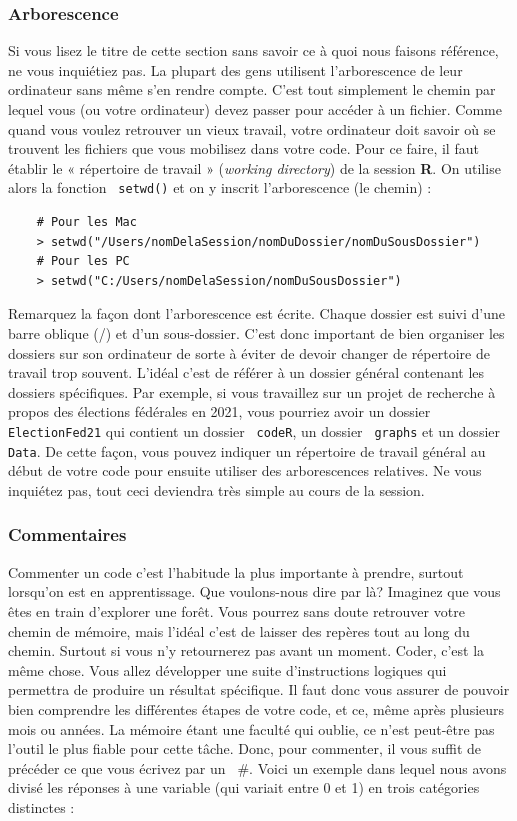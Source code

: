 \documentclass[10.5pt,a4paper]{article}
\newcommand{\rcode}[1]{\texttt{\color{rstudio} #1}}
\begin{document}
    \subsubsection{Arborescence}
    Si vous lisez le titre de cette section sans savoir ce à quoi nous faisons référence, ne vous inquiétiez pas. La plupart des gens utilisent l'arborescence de leur ordinateur sans même s'en rendre compte. C'est tout simplement le chemin par lequel vous (ou votre ordinateur) devez passer pour accéder à un fichier. Comme quand vous voulez retrouver un vieux travail, votre ordinateur doit savoir où se trouvent les fichiers que vous mobilisez dans votre code. Pour ce faire, il faut établir le « répertoire de travail » (\emph{working directory}) de la session \textbf{R}. On utilise alors la fonction \rcode{setwd()} et on y inscrit l'arborescence (le chemin) :
    
    \begin{lstlisting}
    # Pour les Mac
    > setwd("/Users/nomDelaSession/nomDuDossier/nomDuSousDossier")
    # Pour les PC
    > setwd("C:/Users/nomDelaSession/nomDuSousDossier")
    \end{lstlisting}
    
    Remarquez la façon dont l'arborescence est écrite. Chaque dossier est suivi d'une barre oblique (/) et d'un sous-dossier. C'est donc important de bien organiser les dossiers sur son ordinateur de sorte à éviter de devoir changer de répertoire de travail trop souvent. L'idéal c'est de référer à un dossier général contenant les dossiers spécifiques. Par exemple, si vous travaillez sur un projet de recherche à propos des élections fédérales en 2021, vous pourriez avoir un dossier \rcode{ElectionFed21} qui contient un dossier \rcode{codeR}, un dossier \rcode{graphs} et un dossier \rcode{Data}. De cette façon, vous pouvez indiquer un répertoire de travail général au début de votre code pour ensuite utiliser des arborescences relatives. Ne vous inquiétez pas, tout ceci deviendra très simple au cours de la session.
    
    \subsubsection{Commentaires}
    
    Commenter un code c'est l'habitude la plus importante à prendre, surtout lorsqu'on est en apprentissage. Que voulons-nous dire par là? Imaginez que vous êtes en train d'explorer une forêt. Vous pourrez sans doute retrouver votre chemin de mémoire, mais l'idéal c'est de laisser des repères tout au long du chemin. Surtout si vous n'y retournerez pas avant un moment. Coder, c'est la même chose. Vous allez développer une suite d'instructions logiques qui permettra de produire un résultat spécifique. Il faut donc vous assurer de pouvoir bien comprendre les différentes étapes de votre code, et ce, même après plusieurs mois ou années. La mémoire étant une faculté qui oublie, ce n'est peut-être pas l'outil le plus fiable pour cette tâche. Donc, pour commenter, il vous suffit de précéder ce que vous écrivez par un \rcode{$\#$}. Voici un exemple dans lequel nous avons divisé les réponses à une variable (qui variait entre 0 et 1) en trois catégories distinctes :
    
\end{document}
